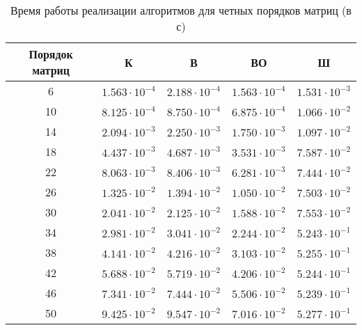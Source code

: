 \begin{table}[h]
	\begin{center}
		\begin{threeparttable}
			\captionsetup{justification=raggedright,singlelinecheck=off}
			\caption{Время работы реализации алгоритмов для четных порядков матриц (в с)}
			\label{tbl:time_measurements_even}
			\begin{tabular}{|c|c|c|c|c|}
				\hline
				Порядок матриц &  К  & В & ВО & Ш \\
				\hline
				6 &$ 1.563\cdot 10^{-4} $&$ 2.188\cdot 10^{-4} $&$ 1.563\cdot 10^{-4} $&$ 1.531\cdot 10^{-3}$\\
				\hline
				10 &$ 8.125\cdot 10^{-4} $&$ 8.750\cdot 10^{-4} $&$ 6.875\cdot 10^{-4} $&$ 1.066\cdot 10^{-2}$\\
				\hline
				14 &$ 2.094\cdot 10^{-3} $&$ 2.250\cdot 10^{-3} $&$ 1.750\cdot 10^{-3} $&$ 1.097\cdot 10^{-2}$\\
				\hline
				18 &$ 4.437\cdot 10^{-3} $&$ 4.687\cdot 10^{-3} $&$ 3.531\cdot 10^{-3} $&$ 7.587\cdot 10^{-2}$\\
				\hline
				22 &$ 8.063\cdot 10^{-3} $&$ 8.406\cdot 10^{-3} $&$ 6.281\cdot 10^{-3} $&$ 7.444\cdot 10^{-2}$\\
				\hline
				26 &$ 1.325\cdot 10^{-2} $&$ 1.394\cdot 10^{-2} $&$ 1.050\cdot 10^{-2} $&$ 7.503\cdot 10^{-2}$\\
				\hline
				30 &$ 2.041\cdot 10^{-2} $&$ 2.125\cdot 10^{-2} $&$ 1.588\cdot 10^{-2} $&$ 7.553\cdot 10^{-2}$\\
				\hline
				34 &$ 2.981\cdot 10^{-2} $&$ 3.041\cdot 10^{-2} $&$ 2.244\cdot 10^{-2} $&$ 5.243\cdot 10^{-1}$\\
				\hline
				38 &$ 4.141\cdot 10^{-2} $&$ 4.216\cdot 10^{-2} $&$ 3.103\cdot 10^{-2} $&$ 5.255\cdot 10^{-1}$\\
				\hline
				42 &$ 5.688\cdot 10^{-2} $&$ 5.719\cdot 10^{-2} $&$ 4.206\cdot 10^{-2} $&$ 5.244\cdot 10^{-1}$\\
				\hline
				46 &$ 7.341\cdot 10^{-2} $&$ 7.444\cdot 10^{-2} $&$ 5.506\cdot 10^{-2} $&$ 5.239\cdot 10^{-1}$\\
				\hline
				50 &$ 9.425\cdot 10^{-2} $&$ 9.547\cdot 10^{-2} $&$ 7.016\cdot 10^{-2} $&$ 5.277\cdot 10^{-1}$\\
				\hline
			\end{tabular}
		\end{threeparttable}
	\end{center}
\end{table}

